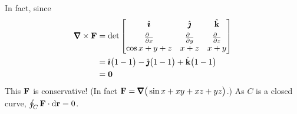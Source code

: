 \begin{eg}
In fact, since
\begin{align*}
\vnabla\times\vF
&=\det\left[\begin{matrix}\hi&\hj&\hk \\[0.05in]
           \frac{\partial\hfill}{\partial x}
                 &\frac{\partial\hfill}{\partial y}
                 &\frac{\partial\hfill}{\partial z}\\
                \cos x +  y+z&x+z&x+y\end{matrix}\right] \\
&=\hi\big(1-1\big)-\hj\big(1-1\big)+\hk\big(1-1\big) \\
&=\vZero 
\end{align*}
This $\mathbf{F}$ is conservative! (In fact 
$\vF=\vnabla\big(\sin x + xy + xz +yz\big)$.) As $C$ is a closed
curve,  $
\oint_C\mathbf{F}\cdot\mathrm{d}\mathbf{r}=0
$.
\end{eg}

